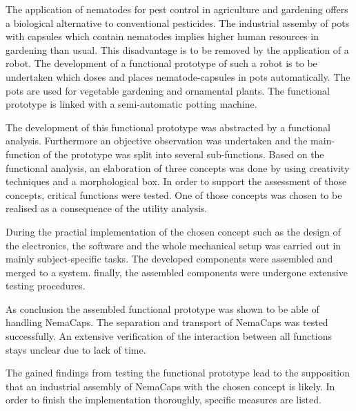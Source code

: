\newpage
The application of nematodes for pest control in agriculture and gardening offers a biological alternative to conventional pesticides. The industrial assemby of pots with capsules which contain nematodes implies higher human resources in gardening than usual. This disadvantage is to be removed by the application of a robot. The development of a functional prototype of such a robot is to be undertaken which doses and places nematode-capsules in pots automatically. The pots are used for vegetable gardening and ornamental plants. The functional prototype is linked with a semi-automatic potting machine.
\newline

The development of this functional prototype was abstracted by a functional analysis. Furthermore an objective observation was undertaken and the main-function of the prototype was split into several sub-functions. Based on the functional analysis, an elaboration of three concepts was done by using creativity techniques and a morphological box. In order to support the assessment of those concepts, critical functions were tested. One of those concepts was chosen to be realised as a consequence of the utility analysis.
\newline

During the practial implementation of the chosen concept such as the design of the electronics, the software and the whole mechanical setup was carried out in mainly subject-specific tasks. The developed components were assembled and merged to a system. finally, the assembled components were undergone extensive testing procedures.
\newline

As conclusion the assembled functional prototype was shown to be able of handling NemaCaps. The separation and transport of NemaCaps was tested successfully. An extensive verification of the  interaction between all functions stays unclear due to lack of time.
\newline

The gained findings from testing the functional prototype lead to the supposition that an industrial assembly of NemaCaps with the chosen concept is likely. In order to finish the implementation thoroughly, specific measures are listed.